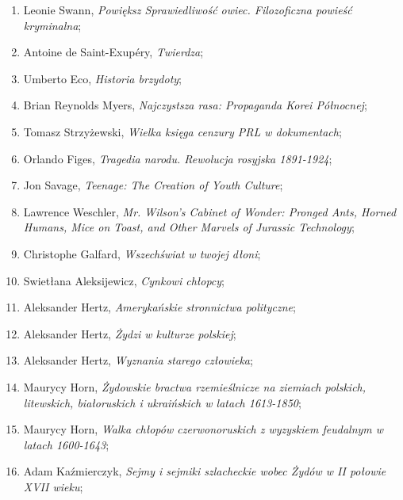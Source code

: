 \documentclass[a4paper,11pt]{article}
\begin{document}
\begin{enumerate}
\item Leonie Swann, \textit{Powiększ Sprawiedliwość owiec. Filozoficzna
    powieść kryminalna};

\item Antoine de Saint-Exupéry, \textit{Twierdza};

\item Umberto Eco, \textit{Historia brzydoty};

\item Brian Reynolds Myers, \textit{Najczystsza rasa: Propaganda Korei
    Północnej};

\item Tomasz Strzyżewski, \textit{Wielka księga cenzury PRL w
    dokumentach};

\item Orlando Figes, \textit{Tragedia narodu. Rewolucja rosyjska
    1891-1924};

\item Jon Savage, \textit{Teenage: The Creation of Youth Culture};

\item Lawrence Weschler, \textit{Mr. Wilson's Cabinet of Wonder: Pronged
    Ants, Horned Humans, Mice on Toast, and Other Marvels of Jurassic
    Technology};

\item Christophe Galfard, \textit{Wszechświat w twojej dłoni};

\item Swietłana Aleksijewicz, \textit{Cynkowi chłopcy};

\item Aleksander Hertz, \textit{Amerykańskie stronnictwa polityczne};

\item Aleksander Hertz, \textit{Żydzi w kulturze polskiej};

\item Aleksander Hertz, \textit{Wyznania starego człowieka};

\item Maurycy Horn, \textit{Żydowskie bractwa rzemieślnicze na ziemiach
    polskich, litewskich, białoruskich i ukraińskich w latach
    1613-1850};

\item Maurycy Horn, \textit{Walka chłopów czerwonoruskich z wyzyskiem
    feudalnym w latach 1600-1643};


\item Adam Kaźmierczyk, \textit{Sejmy i sejmiki szlacheckie wobec Żydów
    w II połowie XVII wieku};


\end{enumerate}
\end{document}
